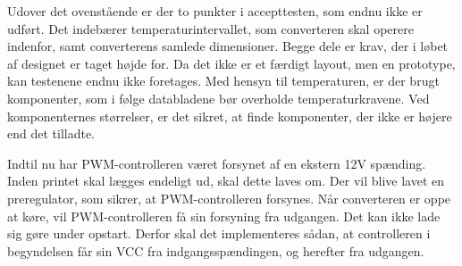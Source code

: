 Udover det ovenstående er der to punkter i accepttesten, som endnu ikke er udført. Det indebærer temperaturintervallet, som converteren skal operere indenfor, samt converterens samlede dimensioner. Begge dele er krav, der i løbet af designet er taget højde for. Da det ikke er et færdigt layout, men en prototype, kan testenene endnu ikke foretages. Med hensyn til temperaturen, er der brugt komponenter, som i følge databladene bør overholde temperaturkravene. Ved komponenternes størrelser, er det sikret, at finde komponenter, der ikke er højere end det tilladte.    

Indtil nu har PWM-controlleren været forsynet af en ekstern 12V spænding. Inden printet skal lægges endeligt ud, skal dette laves om. Der vil blive lavet en preregulator, som sikrer, at PWM-controlleren forsynes. Når converteren er oppe at køre, vil PWM-controlleren få sin forsyning fra udgangen. Det kan ikke lade sig gøre under opstart. Derfor skal det implementeres sådan, at controlleren i begyndelsen får sin VCC fra indgangsspændingen, og herefter fra udgangen. 

